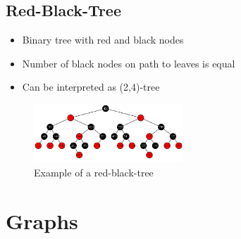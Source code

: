 \documentclass[12pt, a4paper]{scrartcl}
\begin{document}
\subsection{Red-Black-Tree}
\begin{itemize}
\item Binary tree with \textrm{red} and \textrm{black} nodes
\item Number of black nodes on path to leaves is equal
\item Can be interpreted as (2,4)-tree
\end{itemize}
\begin{figure}[htbp]
  \centering
  \includegraphics[width=0.5\textwidth]{red-black_tree}
  \caption{Example of a red-black-tree}
  \label{fig:red-black_tree}
\end{figure}

\section{Graphs}
\label{sec:graphs}
\end{document}

